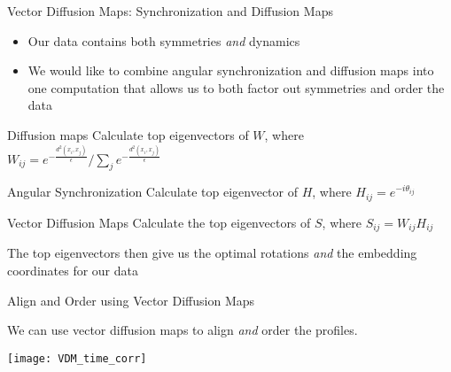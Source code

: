 \begin{frame}{Vector Diffusion Maps: Synchronization and Diffusion Maps}
	\begin{itemize}
		\item Our data contains both symmetries {\em and} dynamics
		\item We would like to combine angular synchronization and diffusion maps into one computation that allows us to both factor out symmetries and order the data
	\end{itemize}
	
	\begin{block}{Diffusion maps}
		Calculate top eigenvectors of $W$, where $W_{ij} = e^{-\frac{d^2(x_i, x_j)}{\epsilon}} / \sum_j e^{-\frac{d^2(x_i, x_j)}{\epsilon}} $
	\end{block}

	\begin{block}{Angular Synchronization}
		Calculate top eigenvector of $H$, where $H_{ij} = e^{-i \theta_{ij}}$
	\end{block}
	
	\begin{block}{Vector Diffusion Maps} 
		Calculate the top eigenvectors of $S$, where $S_{ij} = W_{ij}H_{ij}$
		
		The top eigenvectors then give us the optimal rotations {\em and} the embedding coordinates for our data
	\end{block}
\end{frame}

\begin{frame}{Align and Order using Vector Diffusion Maps}

	\centering
	We can use vector diffusion maps to align {\em and} order the profiles.

	
	\centering
	\texttt{[image: VDM\_time\_corr]}	

\end{frame}